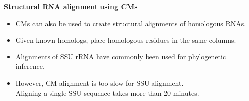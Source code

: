 \documentclass[landscape]{slides}
\begin{document}
\begin{slide}
\begin{center}
\textbf{Structural RNA alignment using CMs}
\end{center}
\medskip

\small
\begin{itemize}
  \item CMs can also be used to create structural alignments of
    homologous RNAs.
  \item Given known homologs, place homologous residues in the same columns.
\end{itemize}


\begin{itemize}
\item Alignments of SSU rRNA have commonly been used for phylogenetic inference.



\item However, CM alignment is too slow for SSU alignment.
   \\ Aligning a single SSU sequence takes more than 20
    minutes.
\end{itemize}
\vfill
\end{slide}
\end{document}
